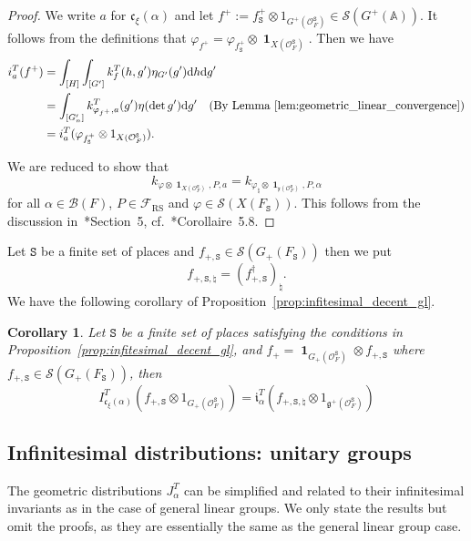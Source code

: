 \documentclass[letterpaper,11pt]{amsart}
\newcommand{\fc}{\mathfrak{c}}
\newcommand{\fg}{\mathfrak{g}}
\newcommand{\fx}{\mathfrak{x}}
\newcommand{\bA}{\mathbb{A}}
\newcommand{\cB}{\mathcal{B}}
\newcommand{\cF}{\mathcal{F}}
\newcommand{\cO}{\mathcal{O}}
\newcommand{\cS}{\mathcal{S}}
\newcommand{\rd}{\mathrm{d}}
\newcommand{\tS}{\mathtt{S}}
\newcommand{\<}{\negthickspace}
\DeclareMathOperator{\id}{\mathbf{1}}
\theoremstyle{definition}
\theoremstyle{plain}
\newtheorem{coro}[definition]{Corollary}
\theoremstyle{remark}
\numberwithin{equation}{section}
\begin{document}
\begin{proof}
We write $a$ for $\fc_\xi(\alpha)$ and let $f^+ := f_\tS^+ \otimes 1_{G^+(\cO_F^\tS)} \in \cS(G^+(\bA))$. It follows from the definitions that $\varphi_{f^+} =
    \varphi_{f^+_{\tS}} \otimes \id_{X(\cO_F^{\tS})}$.
Then we have
\begin{align*}
    i_a^T(f^+) &= \int_{[H]} \int_{[G']} k_f^T(h,g') \eta_{G'}(g') \rd h \rd g' \\
    &= \int_{[G_n']} k^T_{\varphi_{f^+}, a}(g') \eta(\det g') \rd g' \quad (\text{By Lemma \ref{lem:geometric_linear_convergence}}) \\
    &= i^T_a(\varphi_{f^+_\tS} \otimes 1_{X(\cO_F^\tS)}).
\end{align*}

We are reduced to show that
    \[
    k_{\varphi \otimes \id_{X(\cO_F^{\tS})}, P, a}
     =
    k_{\varphi_{\natural} \otimes \id_{\fx(\cO_F^{\tS})}, P, \alpha}
    \]
for all $\alpha \in \cB(F)$, $P \in \cF_{\mathrm{RS}}$ and $\varphi \in
\cS(X(F_{\tS}))$. This follows from the discussion
in~\cite{Zydor3}*{Section~5}, cf.~\cite{Zydor3}*{Corollaire~5.8}.
\end{proof}



Let $\tS$ be a finite set of places and $f_{+, \tS} \in \cS(G_+(F_\tS))$ then
we put
    \[
    f_{+, \tS, \natural} = \left( f_{+, \tS}^\dag \right)_{\natural}.
    \]
We have the following corollary of Proposition~\ref{prop:infitesimal_decent_gl}.
\begin{coro}    \label{coro:infinite_descent_GL}
Let $\tS$ be a finite set of places satisfying the conditions in
Proposition~\ref{prop:infitesimal_decent_gl}, and $f_+ =
\id_{G_+(\cO_F^{\tS})} \otimes f_{+, \tS}$ where $f_{+, \tS} \in
\cS(G_+(F_{\tS}))$, then
    \[
    I_{\fc_{\xi}(\alpha)}^T\left(f_{+, \tS} \otimes 1_{G_+(\cO_F^\tS)}\right) =
    \mathfrak{i}_\alpha^T\left(f_{+, \tS, \natural}
    \otimes 1_{\fg^+(\cO_F^\tS)} \right)
    \]
\end{coro}





    




\subsection{Infinitesimal distributions: unitary groups} \label{subsec:infinitesimal_U}
The geometric distributions $J_{\alpha}^T$ can be simplified and related to
their infinitesimal invariants as in the case of general linear groups. We
only state the results but omit the proofs, as they are essentially the same as the general
linear group case.
\end{document}
